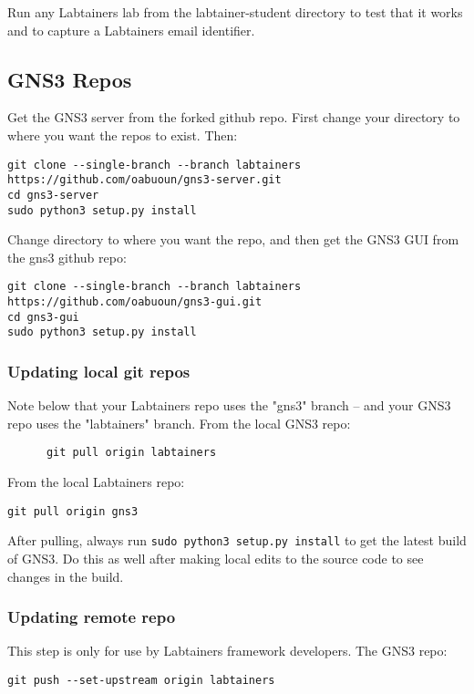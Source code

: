 \documentclass[12pt]{article}
\begin{document}
\vspace{5mm}

\noindent
Run any Labtainers lab from the labtainer-student directory to test that it works and to capture a Labtainers email identifier.

\subsection{GNS3 Repos}
Get the GNS3 server from the forked github repo.  First change your directory to where you want the repos to
exist.  Then:
\small
\begin{verbatim}
git clone --single-branch --branch labtainers https://github.com/oabuoun/gns3-server.git
cd gns3-server
sudo python3 setup.py install
\end{verbatim}

Change directory to where you want the repo, and then get the GNS3 GUI from the gns3 github repo:
\small
\begin{verbatim}
git clone --single-branch --branch labtainers  https://github.com/oabuoun/gns3-gui.git
cd gns3-gui
sudo python3 setup.py install
\end{verbatim}
\normalsize


\subsubsection{Updating local git repos}
Note below that your Labtainers repo uses the "gns3" branch -- and your GNS3 repo uses the "labtainers" branch.
From the local GNS3  repo:
\begin{verbatim}
      git pull origin labtainers
\end{verbatim}

From the local Labtainers repo:
\begin{verbatim}
git pull origin gns3
\end{verbatim}

After pulling, always run {\tt sudo python3 setup.py install} to get the latest 
build of GNS3. Do this as well after making local edits to the source code to see changes in the build.

\subsubsection{Updating remote repo}
This step is only for use by Labtainers framework developers.
The GNS3 repo:
\begin{verbatim}
git push --set-upstream origin labtainers
\end{verbatim}
\end{document}
